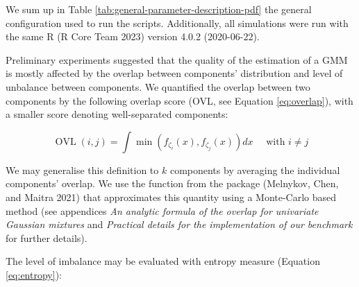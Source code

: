 We sum up in Table \ref{tab:general-parameter-description-pdf} the general configuration used to run the scripts. Additionally, all simulations were run with the same R (R Core Team 2023) version 4.0.2 (2020-06-22).

\begin{table}[!h]

\caption{\label{tab:general-parameter-description-pdf}Global options shared by all the benchmarked packages.}
\centering
{}
\end{table}

Preliminary experiments suggested that the quality of the estimation of a GMM is mostly affected by the overlap between components' distribution and level of unbalance between components. We quantified the overlap between two components by the following overlap score (OVL, see Equation \eqref{eq:overlap}), with a smaller score denoting well-separated components:

\begin{equation}
       \operatorname{OVL}(i, j) = \int \min (f_{\zeta_i} (x), f_{\zeta_j} (x)) dx \quad \text{ with } i \neq j
  \label{eq:overlap}
\end{equation}

We may generalise this definition to \(k\) components by averaging the
individual components' overlap. We use the function
 from the  package (Melnykov, Chen, and Maitra 2021) that approximates this quantity using a Monte-Carlo based method (see appendices \emph{An analytic formula of the overlap for univariate Gaussian mixtures} and \emph{Practical details for the implementation of our benchmark} for further details).

The level of imbalance may be evaluated with entropy measure (Equation \eqref{eq:entropy}):

